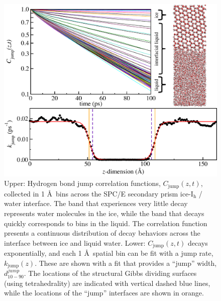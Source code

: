 \begin{figure}
\includegraphics[width=5.5in]{Figures/secPrismJumpPlot}
\caption{\label{fig:SPkjmp} Upper: Hydrogen bond jump correlation
  functions, $C_\mathrm{jump}(z,t)$, collected in 1 \AA~bins across
  the SPC/E secondary prism ice-I$_\mathrm{h}$ / water interface. The band that
  experiences very little decay represents water molecules in the ice,
  while the band that decays quickly corresponds to bins in the
  liquid.  The correlation function presents a continuous distribution
  of decay behaviors across the interface between ice and liquid
  water.  Lower: $C_\mathrm{jump}(z,t)$ decays exponentially, and each
  1 \AA~spatial bin can be fit with a jump rate, $k_\mathrm{jump}(z)$.
  These are shown with a fit that provides a ``jump'' width,
  $d_\mathrm{10-90}^{jump}$. The locations of the structural Gibbs dividing
  surfaces (using tetrahedrality) are indicated with vertical dashed
  blue lines, while the locations of the ``jump'' interfaces are shown in
  orange.}
\end{figure}


